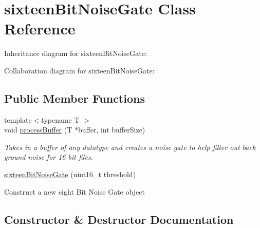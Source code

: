 \hypertarget{classsixteenBitNoiseGate}{}\section{sixteen\+Bit\+Noise\+Gate Class Reference}
\label{classsixteenBitNoiseGate}


Inheritance diagram for sixteen\+Bit\+Noise\+Gate\+:


Collaboration diagram for sixteen\+Bit\+Noise\+Gate\+:
\subsection*{Public Member Functions}
\begin{DoxyCompactItemize}
\item 
{\footnotesize template$<$typename T $>$ }\\void \hyperlink{classsixteenBitNoiseGate_a27bdf787a56e96e7b6ff3f2edd86ca82}{process\+Buffer} (T $\ast$buffer, int buffer\+Size)
\begin{DoxyCompactList}\small\item\em Takes in a buffer of any datatype and creates a noise gate to help filter out back ground noise for 16 bit files. \end{DoxyCompactList}\item 
\hyperlink{classsixteenBitNoiseGate_a5582db482e8dc25fd8962d8c28ac04e2}{sixteen\+Bit\+Noise\+Gate} (uint16\+\_\+t threshold)
\begin{DoxyCompactList}\small\item\em 
\begin{DoxyItemize}
\item Construct a new eight Bit Noise Gate object 
\end{DoxyItemize}\end{DoxyCompactList}\end{DoxyCompactItemize}


\subsection{Constructor \& Destructor Documentation}
\mbox{\label{classsixteenBitNoiseGate_a5582db482e8dc25fd8962d8c28ac04e2}} 

